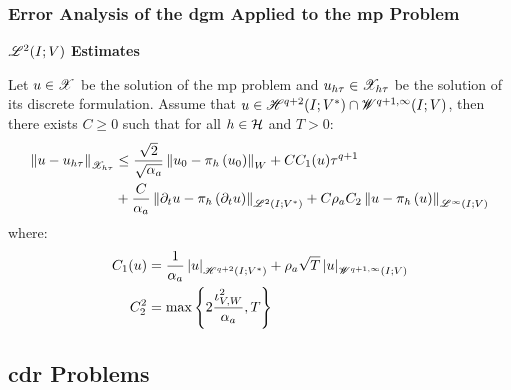 \begin{frame}
    \frametitle{Error Analysis of the \acrshort{dgm} Applied to the \acrshort{mp} Problem}

    \vspace*{\fill}
    \begin{center}
        {\color{\accentcolor} \Large $\mathscr{L}^{2}(I; V)$ \textbf{Estimates}}
        \vspace*{0.25cm}

        \begin{minipage}{0.75\textwidth}
            \begin{theorem}
                Let $u \in \mathscr{X}$ be the solution of the \acrshort{mp} problem and $u_{h \tau} \in \mathscr{X}_{h \tau}$ be the solution of its discrete formulation. Assume that $u \in \mathscr{H}^{q + 2}(I; V^*) \cap \mathscr{W}^{q + 1, \infty}(I; V)$, then there exists $C \geq 0$ such that for all $h \in \mathcal{H}$ and $T > 0$:
                \begin{align*}
                    \left\lVert u - u_{h \tau} \right\rVert_{\mathscr{X}_{h \tau}} & \leq  \frac{\sqrt{2}}{\sqrt{\alpha_{a}}} \left\lVert u_0 - \pi_h \left( u_0 \right) \right\rVert_W + C C_1(u) \tau^{q + 1} \label{eq:estimates_ht} \\
                    & + \frac{C}{\alpha_{a}} \left\lVert \partial_t u - \pi_h \left( \partial_t u \right) \right\rVert_{\mathscr{L}^{2}(I; V^*)} + C \rho_{a} C_2 \left\lVert u - \pi_h \left( u \right) \right\rVert_{\mathscr{L}^{\infty}(I; V)}
                \end{align*}
                where:
                \begin{align*}
                    C_1(u) & = \frac{1}{\alpha_{a}} \left\lvert u \right\rvert_{\mathscr{H}^{q + 2}(I; V^*)} + \rho_{a} \sqrt{T} \left\lvert u \right\rvert_{\mathscr{W}^{q + 1, \infty}(I; V)} \\
                    C_2^2 & = \max \left\{ 2 \frac{\iota_{V, W}^2}{\alpha_{a}}, T \right\}
                \end{align*}
            \end{theorem}
        \end{minipage}
    \end{center}
    \vspace*{\fill}
    
\end{frame}

\subsection{\texorpdfstring{\acrlong{cdr}}{} Problems}

